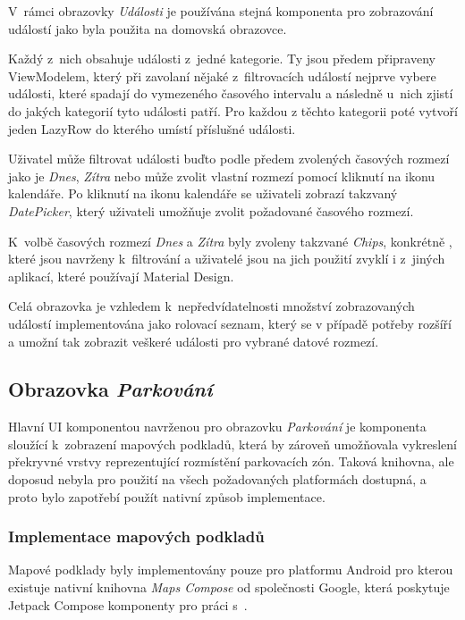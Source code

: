 V~rámci obrazovky \textit{Události} je používána stejná komponenta pro zobrazování událostí jako byla použita na domovská obrazovce. 


Každý z~nich obsahuje události z~jedné kategorie. Ty jsou předem připraveny ViewModelem, který při zavolaní nějaké z~filtrovacích
událostí nejprve vybere události, které spadají do vymezeného časového intervalu a následně u~nich zjistí do jakých kategorií tyto
události patří. Pro každou z těchto kategorii poté vytvoří jeden LazyRow do kterého umístí příslušné události.

Uživatel může filtrovat události buďto podle předem zvolených časových rozmezí jako je \textit{Dnes}, \textit{Zítra} nebo může zvolit vlastní 
rozmezí pomocí kliknutí na ikonu kalendáře. Po kliknutí na ikonu kalendáře se uživateli zobrazí takzvaný \textit{DatePicker}, který 
uživateli umožňuje zvolit požadované časového rozmezí.

K~volbě časových rozmezí \textit{Dnes} a \textit{Zítra} byly zvoleny takzvané \textit{Chips}, konkrétně , které jsou 
navrženy k~filtrování a uživatelé jsou na jich použití zvyklí i z~jiných aplikací, které používají Material Design.

Celá obrazovka je vzhledem k~nepředvídatelnosti množství zobrazovaných událostí implementována jako rolovací seznam, který se v případě potřeby
rozšíří a umožní tak zobrazit veškeré události pro vybrané datové rozmezí.

\subsection{Obrazovka \textit{Parkování}} \label{parkingScreenImpl}
Hlavní UI komponentou navrženou pro obrazovku \textit{Parkování} je komponenta sloužící k~zobrazení mapových podkladů, která by zároveň umožňovala 
vykreslení překryvné vrstvy reprezentující rozmístění parkovacích zón. Taková knihovna, ale doposud nebyla pro použití na všech požadovaných 
platformách dostupná, a proto bylo zapotřebí použít nativní způsob implementace. 

\subsubsection*{Implementace mapových podkladů}
Mapové podklady byly implementovány pouze pro platformu Android pro kterou existuje nativní knihovna \textit{Maps Compose} od společnosti Google, 
která poskytuje Jetpack Compose komponenty pro práci s~.

